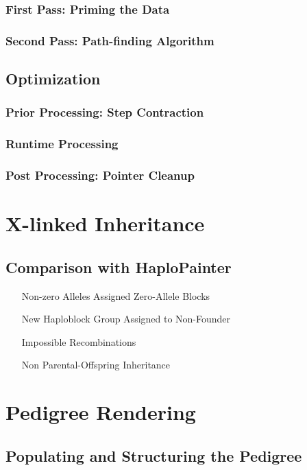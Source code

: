 \subsubsection{First Pass: Priming the Data}
\subsubsection{Second Pass: Path-finding Algorithm}

\subsection{Optimization}
\subsubsection{Prior Processing: Step Contraction}
\subsubsection{Runtime Processing}
\subsubsection{Post Processing: Pointer Cleanup}

\section{X-linked Inheritance}
\subsection{Comparison with HaploPainter}
\begin{enumerate}
\item[Non-zero Alleles Assigned Zero-Allele Blocks]{}
\item[New Haploblock Group Assigned to Non-Founder]{}
\item[Impossible Recombinations]{}
\item[Non Parental-Offspring Inheritance]{}
\end{enumerate}


\section{Pedigree Rendering}

\subsection{Populating and Structuring the Pedigree}
